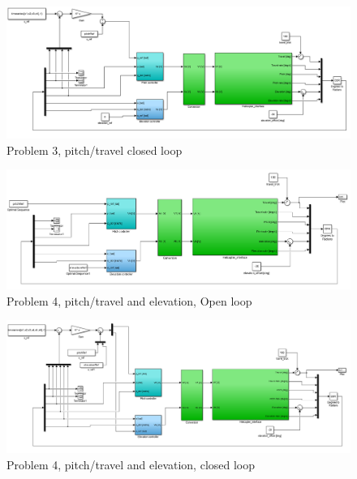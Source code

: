 \begin{figure}[htb]
	\centering
		\includegraphics[width = \textwidth]{figures/simulink/problem3.PNG}
	\caption{Problem 3, pitch/travel closed loop}
\label{fig:problem3}
\end{figure}

\begin{figure}[htb]
	\centering
		\includegraphics[width = \textwidth]{figures/simulink/problem4_OL.PNG}
	\caption{Problem 4, pitch/travel and elevation, Open loop}
\label{fig:problem4_OL}
\end{figure}

\begin{figure}[htb]
	\centering
		\includegraphics[width = \textwidth]{figures/simulink/problem4_CL.PNG}
	\caption{Problem 4, pitch/travel and elevation, closed loop}
\label{fig:problem4_CL}
\end{figure}
